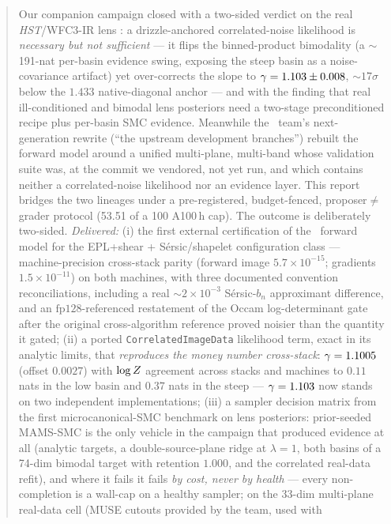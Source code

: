 \begin{abstract}
Our companion campaign \citep{cgl2026companion} closed with a two-sided
verdict on the real {\it HST}/WFC3-IR lens \foundry: a drizzle-anchored
correlated-noise likelihood is \emph{necessary but not sufficient} --- it
flips the binned-product bimodality (a $\sim$191-nat per-basin evidence
swing, exposing the steep basin as a noise-covariance artifact) yet
over-corrects the slope to $\gammaEPL=1.103\pm0.008$, $\sim$$17\sigma$ below
the $1.433$ native-diagonal anchor --- and with the finding that real
ill-conditioned and bimodal lens posteriors need a two-stage preconditioned
recipe plus per-basin SMC evidence. Meanwhile the \gigalens\ team's
next-generation rewrite (``the upstream development branches'') rebuilt the
forward model around a unified multi-plane, multi-band \emph{\sceneapi} whose
validation suite was, at the commit we vendored, not yet run, and which
contains neither a correlated-noise likelihood nor an evidence layer. This
report bridges the two lineages under a pre-registered, budget-fenced,
proposer$\ne$grader protocol (53.51 of a 100 A100\,h cap). The outcome is
deliberately two-sided. \emph{Delivered:} (i) the first external
certification of the \sceneapi\ forward model for the EPL+shear +
S\'ersic/shapelet configuration class --- machine-precision cross-stack
parity (forward image $5.7\times10^{-15}$; gradients $1.5\times10^{-11}$)
on both machines, with three documented convention reconciliations,
including a real $\sim$$2\times10^{-3}$ S\'ersic-$b_n$ approximant
difference, and an $\mathrm{fp}128$-referenced restatement of the Occam
log-determinant gate after the original cross-algorithm reference proved
noisier than the quantity it gated; (ii) a ported
\texttt{CorrelatedImageData} likelihood term, exact in its analytic limits,
that \emph{reproduces the money number cross-stack}: $\gammaEPL=1.1005$
(offset $0.0027$) with $\logZ$ agreement across stacks and machines to
$0.11$ nats in the low basin and $0.37$ nats in the steep ---
$\gammaEPL=1.103$ now stands on two independent
implementations; (iii) a sampler decision matrix from the first
microcanonical-SMC benchmark on lens posteriors: prior-seeded MAMS-SMC is
the only vehicle in the campaign that produced evidence at all (analytic
targets, a double-source-plane ridge at $\lambda{=}1$, both basins of a
74-dim bimodal target with retention $1.000$, and the correlated real-data
refit), and where it fails it fails \emph{by cost, never by health} ---
every non-completion is a wall-cap on a healthy sampler; on the 33-dim
multi-plane real-data cell (MUSE cutouts provided by the team, used with

\end{abstract}
